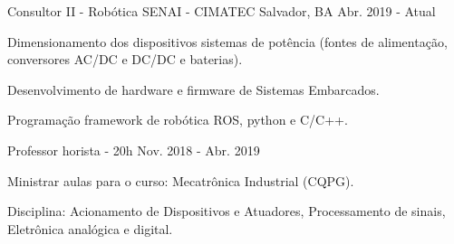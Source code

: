 

\begin{cventries}

  \cventry
    {Consultor II - Robótica} %
    {SENAI - CIMATEC} %
    {Salvador, BA} %
    {Abr. 2019 - Atual} %
    {
      \begin{cvitems} %
        \item {Dimensionamento dos dispositivos sistemas de potência (fontes de alimentação, conversores AC/DC e DC/DC e baterias).}
        \item {Desenvolvimento de hardware e firmware de Sistemas Embarcados.}
        \item {Programação framework de robótica ROS, python e C/C++.}
      \end{cvitems}
    }

  \cventry
    {Professor horista - 20h} %
    {} %
    {} %
    {Nov. 2018 - Abr. 2019} %
    {
      \begin{cvitems} %
        \item {Ministrar aulas para o curso: Mecatrônica Industrial (CQPG).}
        \item {Disciplina: Acionamento de Dispositivos e Atuadores, Processamento de sinais, Eletrônica analógica e digital.}
      \end{cvitems}
    }

    

\end{cventries}

